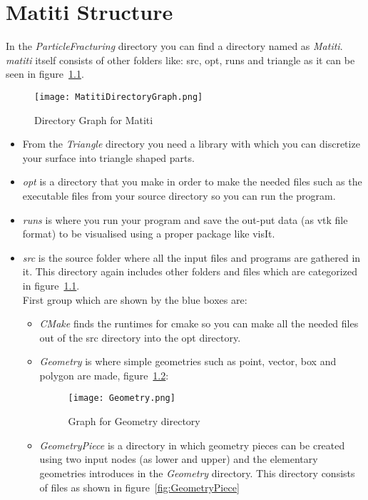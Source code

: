 


\chapter{Matiti Structure} 
\label{sec:MatitiStructure} 
In the \emph{ParticleFracturing} directory you can find a directory named as \emph{Matiti}. \emph{matiti} itself consists of other folders like: src, opt, runs and triangle as it can be seen in figure~\ref{fig:MatitiDirectoryGraph}.
\begin{figure}
  \texttt{[image: MatitiDirectoryGraph.png]}
  \caption{Directory Graph for Matiti}
  \label{fig:MatitiDirectoryGraph}
\end{figure}
\begin{itemize}
\item From the \emph{Triangle} directory you need a library with which you can discretize your surface into triangle shaped parts.    
\item \emph{opt} is a directory that you make in order to make the needed files such as the executable files from your source directory so you can run the program. 
\item \emph{runs} is where you run your program and save the out-put data (as vtk file format) to be visualised using a proper package like visIt. 
\item \emph{src} is the source folder where all the input files and programs are gathered in it. This directory again includes other folders and files which are categorized in figure~\ref{fig:MatitiDirectoryGraph}. \\
First group which are shown by the blue boxes are:
 \begin{itemize}
 \item \emph{CMake} finds the runtimes for cmake so you can make all the needed files out of the src directory into the opt directory.
 \item \emph{Geometry} is where simple geometries such as point, vector, box and polygon are made, figure~\ref{fig:Geometry}:
\begin{figure}
  \texttt{[image: Geometry.png]}
  \caption{Graph for Geometry directory}
  \label{fig:Geometry}
\end{figure}
 \item \emph{GeometryPiece} is a directory in which geometry pieces can be created using two input nodes (as lower and upper) and the elementary geometries introduces in the \emph{Geometry} directory. This directory consists of files as shown in figure~\ref{fig:GeometryPiece}

\end{itemize}
\end{itemize}
